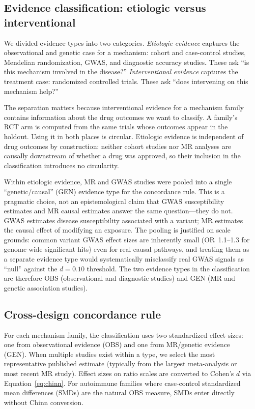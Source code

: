 \documentclass[11pt]{article}
\begin{document}
\subsection{Evidence classification: etiologic versus interventional}

We divided evidence types into two categories. \emph{Etiologic evidence} captures the observational and genetic case for a mechanism: cohort and case-control studies, Mendelian randomization, GWAS, and diagnostic accuracy studies. These ask ``is this mechanism involved in the disease?'' \emph{Interventional evidence} captures the treatment case: randomized controlled trials. These ask ``does intervening on this mechanism help?''

The separation matters because interventional evidence for a mechanism family contains information about the drug outcomes we want to classify. A family's RCT arm is computed from the same trials whose outcomes appear in the holdout. Using it in both places is circular. Etiologic evidence is independent of drug outcomes by construction: neither cohort studies nor MR analyses are causally downstream of whether a drug was approved, so their inclusion in the classification introduces no circularity.

Within etiologic evidence, MR and GWAS studies were pooled into a single ``genetic/causal'' (GEN) evidence type for the concordance rule. This is a pragmatic choice, not an epistemological claim that GWAS susceptibility estimates and MR causal estimates answer the same question---they do not. GWAS estimates disease susceptibility associated with a variant; MR estimates the causal effect of modifying an exposure. The pooling is justified on scale grounds: common variant GWAS effect sizes are inherently small (OR~1.1--1.3 for genome-wide significant hits) even for real causal pathways, and treating them as a separate evidence type would systematically misclassify real GWAS signals as ``null'' against the $d = 0.10$ threshold. The two evidence types in the classification are therefore OBS (observational and diagnostic studies) and GEN (MR and genetic association studies).

\subsection{Cross-design concordance rule}

For each mechanism family, the classification uses two standardized effect sizes: one from observational evidence (OBS) and one from MR/genetic evidence (GEN). When multiple studies exist within a type, we select the most representative published estimate (typically from the largest meta-analysis or most recent MR study). Effect sizes on ratio scales are converted to Cohen's $d$ via Equation~\ref{eq:chinn}. For autoimmune families where case-control standardized mean differences (SMDs) are the natural OBS measure, SMDs enter directly without Chinn conversion.
\end{document}
